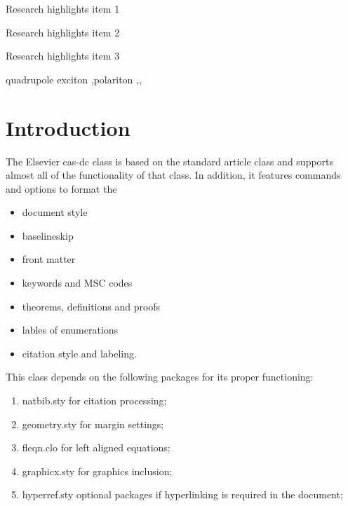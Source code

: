 \documentclass[a4paper,fleqn]{cas-dc}
\begin{document}
\begin{highlights}
\item Research highlights item 1
\item Research highlights item 2
\item Research highlights item 3
\end{highlights}

\begin{keywords}
quadrupole exciton \sep polariton \sep \WGM \sep \BEC
\end{keywords}


\maketitle

\section{Introduction}

The Elsevier cas-dc class is based on the
standard article class and supports almost all of the functionality of
that class. In addition, it features commands and options to format the
\begin{itemize} \item document style \item baselineskip \item front
matter \item keywords and MSC codes \item theorems, definitions and
proofs \item lables of enumerations \item citation style and labeling.
\end{itemize}

This class depends on the following packages
for its proper functioning:

\begin{enumerate}
\itemsep=0pt
\item {natbib.sty} for citation processing;
\item {geometry.sty} for margin settings;
\item {fleqn.clo} for left aligned equations;
\item {graphicx.sty} for graphics inclusion;
\item {hyperref.sty} optional packages if hyperlinking is
  required in the document;
\end{enumerate}  
\end{document}
